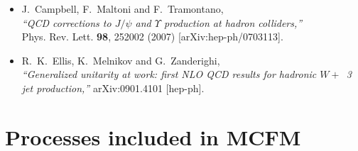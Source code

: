 \documentclass[12pt]{article}
\begin{document}
\begin{itemize}
\item J.~Campbell, F.~Maltoni and F.~Tramontano, \\
  {\it ``QCD corrections to $J/\psi$ and $\Upsilon$ production
  at hadron colliders,''} \\
  Phys. Rev. Lett. {\bf 98}, 252002 (2007)
  [arXiv:hep-ph/0703113].
\item R.~K.~Ellis, K.~Melnikov and G.~Zanderighi,\\
  {\it ``Generalized unitarity at work: first NLO QCD results for hadronic $W+$~3 jet production,''}
  arXiv:0901.4101 [hep-ph].
\end{itemize}

\clearpage
\section{Processes included in MCFM}
\label{MCFMprocs}
\end{document}
